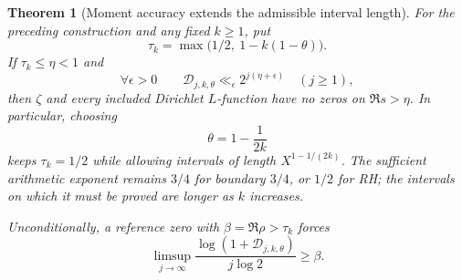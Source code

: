 \documentclass[11pt]{article}
\newtheorem{theorem}{Theorem}[section]
\theoremstyle{definition}
\begin{document}
\begin{theorem}[Moment accuracy extends the admissible interval length]
\label{thm:long-interval-reverse-capacity}
For the preceding construction and any fixed $k\ge1$, put
\[
 \tau_k=\max\bigl(1/2,\ 1-k(1-\theta)\bigr).
\]
If $\tau_k\le\eta<1$ and
\begin{equation}
 \forall\epsilon>0\qquad
       \mathcal D_{j,k,\theta}
             \ll_\epsilon 2^{j(\eta+\epsilon)}\quad(j\ge1),
 \label{eq:long-interval-capacity-target}
\end{equation}
then $\zeta$ and every included Dirichlet $L$-function have
no zeros on $\Re s>\eta$.
In particular, choosing
\begin{equation}
                   \theta=1-\frac{1}{2k}
 \label{eq:moment-optimal-cell-length}
\end{equation}
keeps $\tau_k=1/2$ while allowing intervals of length
$X^{1-1/(2k)}$.
The sufficient arithmetic exponent remains $3/4$ for boundary
$3/4$, or $1/2$ for RH; the intervals on which it must be
proved are longer as $k$ increases.

Unconditionally, a reference zero with $\beta=\Re\rho>\tau_k$
forces
\begin{equation}
 \limsup_{j\to\infty}
 \frac{\log(1+\mathcal D_{j,k,\theta})}{j\log2}\ge\beta.
 \label{eq:long-interval-zero-readout}
\end{equation}
\end{theorem}
\end{document}
